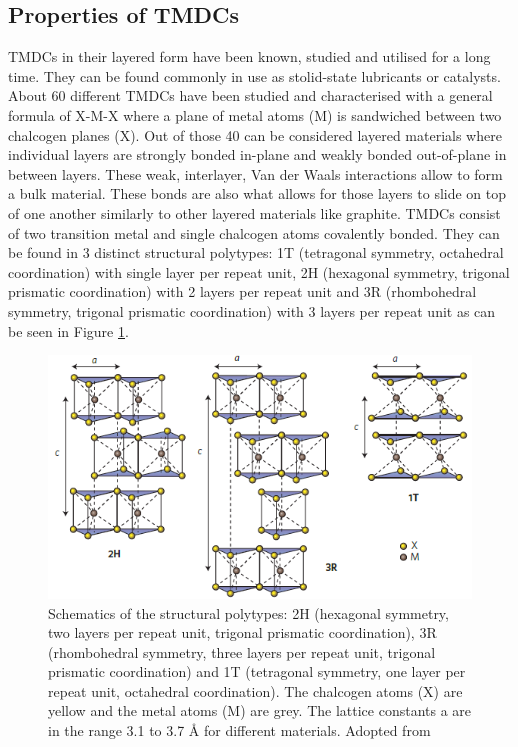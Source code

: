 \documentclass[12pt]{article}
\begin{document}
	\subsection{Properties of TMDCs}
	TMDCs in their layered form have been known, studied and utilised for a long time. They can be found commonly in use as stolid-state lubricants or catalysts. About 60 different TMDCs have been studied and characterised with a general formula of X-M-X where a plane of metal atoms (M) is sandwiched between two chalcogen planes (X). Out of those 40 can be considered layered materials where individual layers are strongly bonded in-plane and weakly bonded out-of-plane in between layers. These weak, interlayer, Van der Waals interactions allow to form a bulk material. These bonds are also what allows for those layers to slide on top of one another similarly to other layered materials like graphite. 
	TMDCs consist of two transition metal and single chalcogen atoms covalently bonded. They can be found in 3 distinct structural polytypes: 1T (tetragonal symmetry, octahedral coordination) with single layer per repeat unit, 2H (hexagonal symmetry, trigonal prismatic coordination) with 2 layers per repeat unit and 3R (rhombohedral symmetry, trigonal prismatic coordination) with 3 layers per repeat unit \cite{ElectronicsAndOptoelectronicsOfTwo-dimensionalTransitionMetalDichalcogenides} as can be seen in Figure \ref{fig:TMDCPolytypes}.
	
	\begin{figure}[h]
	\begin{center}
	\includegraphics[scale=0.7]{TMDCPolytypes.png}
	\caption{Schematics of the structural polytypes: 2H (hexagonal symmetry, two layers per repeat unit, trigonal prismatic coordination), 3R (rhombohedral symmetry, three layers per repeat unit, trigonal prismatic coordination) and 1T (tetragonal symmetry, one layer per repeat unit, octahedral coordination). The chalcogen atoms (X) are yellow and the metal atoms (M) are grey. The lattice constants a are in the range 3.1 to 3.7 Å for different materials. Adopted from \cite{ElectronicsAndOptoelectronicsOfTwo-dimensionalTransitionMetalDichalcogenides}}
	\label{fig:TMDCPolytypes}
	\end{center}
	\end{figure}
	
\end{document}
